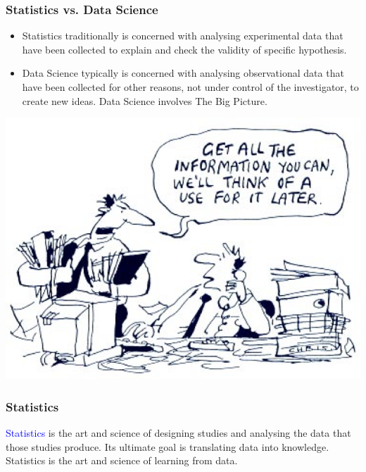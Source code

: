 \documentclass{beamer}
\begin{document}
\begin{frame}
\frametitle{Statistics vs. Data Science}
\begin{itemize}
\item Statistics traditionally is concerned with analysing experimental data that have been
collected to explain and check the validity of specific hypothesis.
\item Data Science typically is concerned with  analysing observational data that have been 
collected for other reasons, not under control of the investigator, to create new ideas. Data Science involves The Big Picture.
\end{itemize}
\begin{center}
\vspace{-.35cm}
\includegraphics[scale=0.55]{./figures/ds.png}
\end{center}
\end{frame}
\begin{frame}
\frametitle{Statistics}
\textcolor{blue}{Statistics} is the art and science of designing studies and analysing the data that those studies produce. 
Its ultimate goal is translating data into knowledge. Statistics is the art and science of learning from data.

\end{frame}
\end{document}
